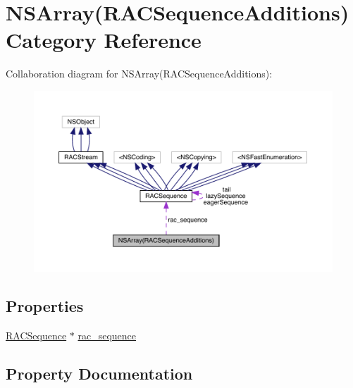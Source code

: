 \hypertarget{category_n_s_array_07_r_a_c_sequence_additions_08}{}\section{N\+S\+Array(R\+A\+C\+Sequence\+Additions) Category Reference}
\label{category_n_s_array_07_r_a_c_sequence_additions_08}


Collaboration diagram for N\+S\+Array(R\+A\+C\+Sequence\+Additions)\+:\nopagebreak
\begin{figure}[H]
\begin{center}
\leavevmode
\includegraphics[width=350pt]{category_n_s_array_07_r_a_c_sequence_additions_08__coll__graph}
\end{center}
\end{figure}
\subsection*{Properties}
\begin{DoxyCompactItemize}
\item 
\mbox{\hyperlink{interface_r_a_c_sequence}{R\+A\+C\+Sequence}} $\ast$ \mbox{\hyperlink{category_n_s_array_07_r_a_c_sequence_additions_08_aa445a009fc9e4ec4ff3de323d5d38edb}{rac\+\_\+sequence}}
\end{DoxyCompactItemize}


\subsection{Property Documentation}
\mbox{\label{category_n_s_array_07_r_a_c_sequence_additions_08_aa445a009fc9e4ec4ff3de323d5d38edb}} 
